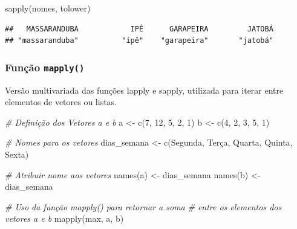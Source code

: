 \documentclass[
]{article}
\newenvironment{Shaded}{\begin{snugshade}}{\end{snugshade}}
\newcommand{\CommentTok}[1]{\textcolor[rgb]{0.56,0.35,0.01}{\textit{#1}}}
\newcommand{\DecValTok}[1]{\textcolor[rgb]{0.00,0.00,0.81}{#1}}
\newcommand{\FunctionTok}[1]{\textcolor[rgb]{0.00,0.00,0.00}{#1}}
\newcommand{\NormalTok}[1]{#1}
\newcommand{\OtherTok}[1]{\textcolor[rgb]{0.56,0.35,0.01}{#1}}
\newcommand{\StringTok}[1]{\textcolor[rgb]{0.31,0.60,0.02}{#1}}
\begin{document}
\begin{Shaded}
\begin{Highlighting}[]
\FunctionTok{sapply}\NormalTok{(nomes, tolower)}
\end{Highlighting}
\end{Shaded}

\begin{verbatim}
##   MASSARANDUBA            IPÊ      GARAPEIRA         JATOBÁ 
## "massaranduba"          "ipê"    "garapeira"       "jatobá"
\end{verbatim}

\hypertarget{funuxe7uxe3o-mapply}{%
\subsubsection{\texorpdfstring{Função
\texttt{mapply()}}{Função mapply()}}\label{funuxe7uxe3o-mapply}}

Versão multivariada das funções lapply e sapply, utilizada para iterar
entre elementos de vetores ou listas.

\begin{Shaded}
\begin{Highlighting}[]
\CommentTok{\# Definição dos Vetores a e b}
\NormalTok{a }\OtherTok{\textless{}{-}} \FunctionTok{c}\NormalTok{(}\DecValTok{7}\NormalTok{, }\DecValTok{12}\NormalTok{, }\DecValTok{5}\NormalTok{, }\DecValTok{2}\NormalTok{, }\DecValTok{1}\NormalTok{) }
\NormalTok{b }\OtherTok{\textless{}{-}} \FunctionTok{c}\NormalTok{(}\DecValTok{4}\NormalTok{, }\DecValTok{2}\NormalTok{, }\DecValTok{3}\NormalTok{, }\DecValTok{5}\NormalTok{, }\DecValTok{1}\NormalTok{)}

\CommentTok{\# Nomes para os vetores}
\NormalTok{dias\_semana }\OtherTok{\textless{}{-}} \FunctionTok{c}\NormalTok{(}\StringTok{\textquotesingle{}Segunda\textquotesingle{}}\NormalTok{, }\StringTok{\textquotesingle{}Terça\textquotesingle{}}\NormalTok{, }\StringTok{\textquotesingle{}Quarta\textquotesingle{}}\NormalTok{, }\StringTok{\textquotesingle{}Quinta\textquotesingle{}}\NormalTok{, }\StringTok{\textquotesingle{}Sexta\textquotesingle{}}\NormalTok{)}

\CommentTok{\# Atribuir nome aos vetores}
\FunctionTok{names}\NormalTok{(a) }\OtherTok{\textless{}{-}}\NormalTok{ dias\_semana}
\FunctionTok{names}\NormalTok{(b) }\OtherTok{\textless{}{-}}\NormalTok{ dias\_semana}

\CommentTok{\# Uso da função mapply() para retornar a soma}
\CommentTok{\# entre os elementos dos vetores a e b}
\FunctionTok{mapply}\NormalTok{(max, a, b)}
\end{Highlighting}
\end{Shaded}
\end{document}
